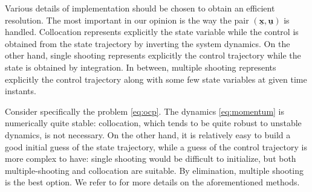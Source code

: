 Various details of implementation should be chosen to obtain an efficient resolution. The most important in our opinion is the way the pair $(\underline{\bm x},\underline{\bm u})$ is handled. 
Collocation \cite{qiu_dhm11,mordatch:tog:12} represents explicitly the state variable while the control is obtained from the state trajectory by inverting the system dynamics. On the other hand, single shooting \cite{tassa:icra:14,perrin_isrr15} represents explicitly the control trajectory while the state is obtained by integration. In between, multiple shooting represents explicitly the control trajectory along with some few state variables at given time instants. 

Consider specifically the problem \eqref{eq:ocp}. The dynamics \eqref{eq:momentum} is numerically quite stable: collocation, which tends to be quite robust to unstable dynamics, is not necessary. On the other hand, it is relatively easy to build a good initial guess of the state trajectory, while a guess of the control trajectory is more complex to have: single shooting would be difficult to initialize, but both multiple-shooting and collocation are suitable. By elimination, multiple shooting is the best option.
%
We refer to \cite{FastMS} for more details on the aforementioned methods.
